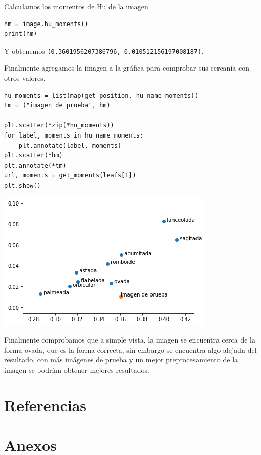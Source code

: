 \documentclass[letter]{article}
\begin{document}
Calculamos los momentos de Hu de la imagen

\begin{verbatim}
hm = image.hu_moments()
print(hm)
\end{verbatim}

Y obtenemos \texttt{(0.3601956207386796, 0.010512156197008187)}.

Finalmente agregamos la imagen a la gráfica para comprobar sus cercanía con
otros valores.

\begin{verbatim}
hu_moments = list(map(get_position, hu_name_moments))
tm = ("imagen de prueba", hm)

plt.scatter(*zip(*hu_moments))
for label, moments in hu_name_moments:
    plt.annotate(label, moments)
plt.scatter(*hm)
plt.annotate(*tm)
url, moments = get_moments(leafs[1])
plt.show()
\end{verbatim}

\begin{center}
\includegraphics[width=.9\linewidth]{./images/result.png}
\end{center}

Finalmente comprobamos que a simple vista, la imagen se encuentra cerca de la
forma ovada, que es la forma correcta, sin embargo se encuentra algo alejada del
resultado, con más imágenes de prueba y un mejor preprocesamiento de la imagen
se podrían obtener mejores resultados.

\section{Referencias}
\label{sec:org5ca9fb5}

\section{Anexos}
\label{sec:orgdf60c56}
\end{document}
